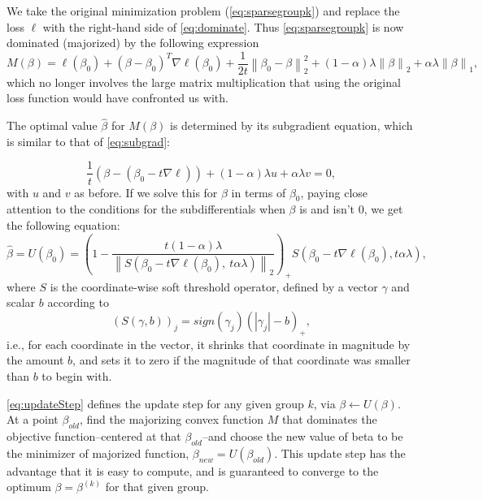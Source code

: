 \documentclass[12pt]{article}
\newcommand{\norm}[1]{\left\lVert #1 \right\rVert}
\begin{document}
We take the original minimization problem (\autoref{eq:sparsegroupk}) and replace the loss $\ell$ with the right-hand side of \autoref{eq:dominate}. Thus \autoref{eq:sparsegroupk} is now dominated (majorized) by the following expression
\begin{equation}
\label{eq:Meq}
M(\beta) = \ell(\beta_0)+(\beta - \beta_0)^T\nabla \ell(\beta_0)+\frac{1}{2t}\norm{\beta_0-\beta}_2^2+ (1-\alpha)\lambda\norm{\beta}_2+\alpha\lambda\norm{\beta}_1,
\end{equation}
which no longer involves the large matrix multiplication that using the original loss function would have confronted us with. 

The optimal value $\hat{\beta}$ for $M(\beta)$ is determined by its subgradient equation, which is similar to that of \autoref{eq:subgrad}:

\begin{equation}
\frac{1}{t} (\beta - (\beta_0 - t\nabla \ell)) +(1-\alpha)\lambda u + \alpha \lambda v = 0,
\end{equation}
with $u$ and $v$ as before. If we solve this for $\beta$ in terms of $\beta_0$, paying close attention to the conditions for the subdifferentials when $\beta$ is and isn't $0$, we get the following equation:
\begin{equation}
\hat{\beta} = U(\beta_0) =
\left(1-\frac{t(1-\alpha)\lambda}{\norm{S(\beta_0-t\nabla \ell(\beta_0),\ t\alpha\lambda)}_2}\right)_+ S(\beta_0-t\nabla \ell(\beta_0),t\alpha\lambda),
\label{eq:updateStep}
\end{equation}
where $S$ is the coordinate-wise soft threshold operator, defined by a vector $\gamma$ and scalar $b$ according to
\begin{equation}
\label{softthresh}
(S(\gamma,b))_j = sign(\gamma_j)(|\gamma_j| - b)_+,
\end{equation}
i.e., for each coordinate in the vector, it shrinks that coordinate in magnitude by the amount $b$, and sets it to zero if the magnitude of that coordinate was smaller than $b$ to begin with.



\autoref{eq:updateStep} defines the update step for any given group $k$, via $\beta \leftarrow U(\beta)$. At a point $\beta_{old}$, find the majorizing convex function $M$ that dominates the objective function--centered at that $\beta_{old}$--and choose the new value of beta to be the minimizer of majorized function, $\beta_{new} = U(\beta_{old})$. This update step has the advantage that it is easy to compute, and is guaranteed to converge to the optimum $\beta = \beta^{(k)}$ for that given group.  
\end{document}
